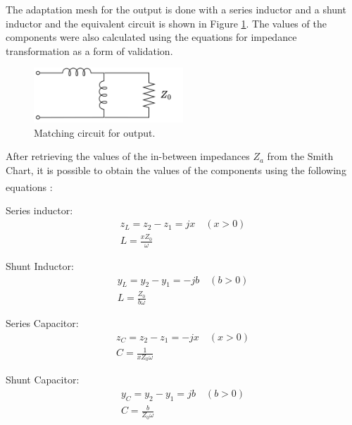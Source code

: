 The adaptation mesh for the output is done with a series inductor and a shunt inductor and the equivalent circuit is shown in Figure \ref{fig:MatchingCircuit-output}. The values of the components were also calculated using the equations for impedance transformation as a form of validation.

\begin{figure}[h]
    \centering
    \includegraphics[width=0.5\textwidth]{Images/Ouput-matching-circuit.png}
    \caption{Matching circuit for output.}
    \label{fig:MatchingCircuit-output} 
\end{figure}

After retrieving the values of the in-between impedances $Z_a$ from the Smith Chart, it is possible to obtain the values of the components using the following equations \textsuperscript{\cite{Pozar}}:

\vspace{0.4cm}
Series inductor:
\begin{equation}
    \begin{split}
        z_L = z_2 -  z_1 = jx \quad(x > 0)\\
        L = \frac{xZ_0}{\omega}
    \end{split}
    \label{eq:SeriesInductor}
\end{equation}

Shunt Inductor:
\begin{equation}
    \begin{split}
       y_L = y_2 -  y_1 = -jb \quad(b > 0)\\
        L = \frac{Z_0}{b\omega} 
    \end{split}
    \label{eq:ShuntInductor}
\end{equation}

Series Capacitor:
\begin{equation}
    \begin{split}
        z_C = z_2 -  z_1 = -jx \quad(x > 0)\\
        C = \frac{1}{xZ_0\omega}
    \end{split}
    \label{eq:SeriesCapacitor}
\end{equation}

Shunt Capacitor:
\begin{equation}
    \begin{split}
        y_C = y_2 -  y_1 = jb \quad(b > 0)\\
        C = \frac{b}{Z_0\omega}
    \end{split}
    \label{eq:ShuntCapacitor}
\end{equation}

